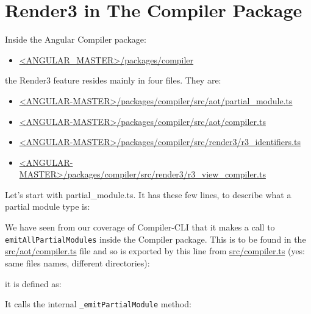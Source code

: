 \section{Render3 in The Compiler Package}

Inside the Angular Compiler package:

\begin{itemize}
  \item \href{https://github.com/angular/angular/tree/master/packages/compiler/}
        {<ANGULAR\_MASTER>/packages/compiler}
\end{itemize}

the Render3 feature resides mainly in four files. They are:

\begin{itemize}
  \item \href{https://github.com/angular/angular/blob/master/packages/compiler/src/aot/partial_module.ts}
        {<ANGULAR-MASTER>/packages/compiler/src/aot/partial\_module.ts}
  \item \href{https://github.com/angular/angular/blob/master/packages/compiler/src/aot/compiler.ts}
        {<ANGULAR-MASTER>/packages/compiler/src/aot/compiler.ts}
  \item \href{https://github.com/angular/angular/blob/master/packages/compiler/src/render3/r3_identifiers.ts}
        {<ANGULAR-MASTER>/packages/compiler/src/render3/r3\_identifiers.ts}
  \item \href{https://github.com/angular/angular/blob/master/packages/compiler/src/render3/r3_view_compiler.ts}
        {<ANGULAR-MASTER>/packages/compiler/src/render3/r3\_view\_compiler.ts}
\end{itemize}

Let’s start with partial\_module.ts. It has these few lines, to describe what a partial
module type is:



We have seen from our coverage of Compiler-CLI that it makes a call to
\texttt{emitAllPartialModules}
inside the Compiler package. This is to be found in the
\url{src/aot/compiler.ts}
file and so is exported by this line from
\url{src/compiler.ts}
(yes: same
files names, different directories):



it is defined as:



It calls the internal
\texttt{\_emitPartialModule}
method:

